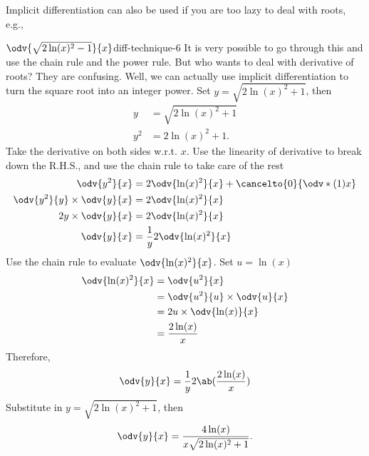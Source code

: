 Implicit differentiation can also be used if you are too lazy to deal with roots, e.g.,
\begin{exmp}{$\odv{\sqrt{2\ln(x)^2 - 1}}{x}$}{diff-technique-6}
	It is very possible to go through this and use the chain rule and the power rule. But who wants to deal with derivative of roots? They are confusing. Well, we can actually use implicit differentiation to turn the square root into an integer power. Set $y = \sqrt{2\ln(x)^2 + 1}$, then
	\begin{align}
		y  	& = \sqrt{2\ln(x)^2 + 1} \\
		y^2 & = 2\ln(x)^2 + 1.
	\end{align}
	Take the derivative on both sides w.r.t. $x$. Use the linearity of derivative to break down the R.H.S., and use the chain rule to take care of the rest
	\begin{align}
		\odv{y^2}{x}                 & = 2\odv{\ln(x)^2}{x} + \cancelto{0}{\odv*{(1)}{x}} \\
		\odv{y^2}{y}\times\odv{y}{x} & = 2\odv{\ln(x)^2}{x}                               \\
		2y\times\odv{y}{x}           & = 2\odv{\ln(x)^2}{x}                               \\
		\odv{y}{x}                   & = \frac{1}{y}2\odv{\ln(x)^2}{x}
	\end{align}
	Use the chain rule to evaluate $\odv{\ln(x)^2}{x}$. Set $u = \ln(x)$
	\begin{align}
		\odv{\ln(x)^2}{x} & = \odv{u^2}{x}                   \\
		                  & = \odv{u^2}{u} \times \odv{u}{x} \\
		                  & = 2u \times \odv{\ln(x)}{x}      \\
		                  & = \frac{2\ln(x)}{x}
	\end{align}
	Therefore,
	\begin{equation}
		\odv{y}{x} = \frac{1}{y}2\ab(\frac{2\ln(x)}{x})
	\end{equation}
	Substitute in $y = \sqrt{2\ln(x)^2 + 1}$, then
	\begin{equation}
		\odv{y}{x} = \frac{4\ln(x)}{x\sqrt{ 2\ln(x)^2 + 1 }}.
	\end{equation}
\end{exmp}

